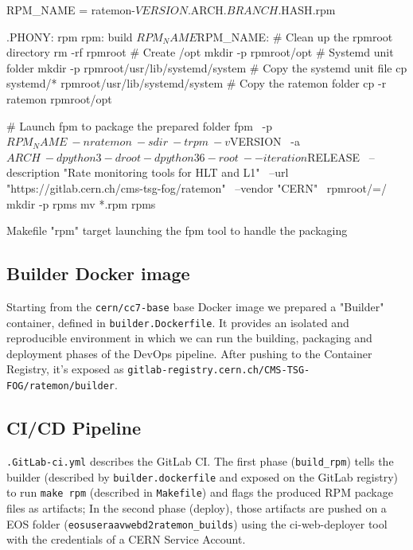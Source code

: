 \begin{listing}[ht]
\begin{yamlcode}

RPM_NAME = ratemon-${VERSION}.${ARCH}.${BRANCH}.${HASH}.rpm

.PHONY: rpm
rpm: build ${RPM_NAME}
${RPM_NAME}:
  # Clean up the rpmroot directory
  rm -rf rpmroot
  # Create /opt
  mkdir -p rpmroot/opt
  # Systemd unit folder
  mkdir -p rpmroot/usr/lib/systemd/system
  # Copy the systemd unit file
  cp systemd/* rpmroot/usr/lib/systemd/system
  # Copy the ratemon folder
  cp -r ratemon rpmroot/opt

  # Launch fpm to package the prepared folder 
  fpm \
  -p ${RPM_NAME} \
  -n ratemon \
  -s dir \
  -t rpm \
  -v ${VERSION} \
  -a ${ARCH} \
  -d python3 -d root -d python36-root \
  --iteration ${RELEASE} \
  --description "Rate monitoring tools for HLT and L1" \
  --url "https://gitlab.cern.ch/cms-tsg-fog/ratemon" \
  --vendor "CERN" \
  rpmroot/=/
  mkdir -p rpms
  mv *.rpm rpms
\end{yamlcode}
\caption{Makefile "rpm" target launching the fpm tool to handle the packaging}
\end{listing}

\subsection{}

\subsection{Builder Docker image}

Starting from the \texttt{cern/cc7-base} base Docker image we prepared a "Builder" container, defined in \texttt{builder.Dockerfile}. It provides an isolated and reproducible environment in which we can run the building, packaging and deployment phases of the DevOps pipeline.
After pushing to the Container Registry, it's exposed as \texttt{gitlab-registry.cern.ch/CMS-TSG-FOG/ratemon/builder}.

\subsection{CI/CD Pipeline}

\texttt{.GitLab-ci.yml} describes the GitLab CI. The first phase (\texttt{build\_rpm}) tells the builder (described by \texttt{builder.dockerfile} and exposed on the GitLab registry) to run \texttt{make rpm} (described in \texttt{Makefile}) and flags the produced RPM package files as artifacts; In the second phase (deploy), those artifacts are pushed on a EOS folder (\texttt{\/eos\/user\/a\/avwebd2\/ratemon\_builds}) using the ci-web-deployer tool with the credentials of a CERN Service Account.



